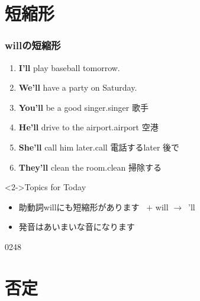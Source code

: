 \documentclass[aspectratio=169,xcolor={dvipsnames,table}]{beamer}
\newcommand{\myaudio}[1]{\href{#1}{\faVolumeUp}}
\begin{document}
\section{短縮形}
\begin{frame}[plain]\frametitle{willの短縮形}

\begin{enumerate}
 \item {\bfseries I'll} play baseball tomorrow.
 \item {\bfseries We'll} have a party on Saturday.
 \item {\bfseries You'll} be a  good singer.\hfill{\scriptsize singer  歌手}
 \item {\bfseries He'll} drive to the airport.\hfill{\scriptsize airport  空港}
 \item {\bfseries She'll} call him later.\hfill{\scriptsize call  電話する\hspace{8pt}later  後で}
 \item {\bfseries They'll} clean the room.\hfill{\scriptsize clean  掃除する}
\end{enumerate}

\vfill

\begin{block}<2->{Topics for Today}
\begin{itemize}[square]\small
 \item  助動詞willにも短縮形があります\
\hfill{} $+$ will $\longrightarrow$ \,'ll\hfill\mbox{}

 \item 発音はあいまいな音になります%
 \end{itemize}
     \end{block}

\mbox{}\hfill{\tiny 0248}\,{\scriptsize \myaudio{./audio/012_will_03a.mp3}}
\end{frame}
\section{否定}
\end{document}
